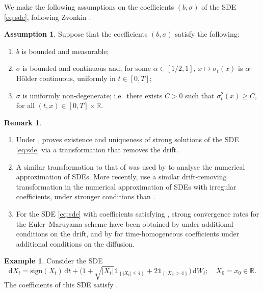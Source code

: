 \documentclass[onseside, final]{amsart}
\theoremstyle{definition}
\newtheorem{example}[theorem]{Example}
\newtheorem{remark}[theorem]{Remark}
\newtheorem{assumption}[theorem]{Assumption}
\newcommand{\R}{\mathbb R}
\newcommand{\sign}{\mathrm{sign}}
\newcommand{\D}{\,\mathrm{d}}
\newcommand{\ds}{\mathrm{d}}
\newcommand{\ind}[1]{\mathds{1}_{\!\left\{{#1}\right\}\!}}
\numberwithin{equation}{section}
\begin{document}
	We make the following assumptions on the coefficients $(b, \sigma)$ of the SDE \eqref{eq:sde}, following Zvonkin \citep{Zv74}.
	
	\begin{assumption}\label{ass:zvonkin}Suppose that the coefficients $(b, \sigma)$ satisfy the following:
		\begin{enumerate}[label = (\roman*)]
			\item $b$ is bounded and measurable;
			\item $\sigma$ is bounded and continuous and, for some $\alpha \in [1/2, 1]$, $x \mapsto \sigma_t(x)$ is $\alpha$-H\"older continuous, uniformly in $t \in [0, T]$;
			\item $\sigma$ is uniformly non-degenerate; i.e.\ there exists $C > 0$ such that $\sigma^2_t(x) \geq C$, for all $(t, x) \in [0, T] \times \R$.
		\end{enumerate}
	\end{assumption}
	
	\begin{remark}\label{rem:zvonkin}~
		\begin{enumerate}[label = (\roman*)]
			\item Under , \citet[Theorem 4]{Zv74} proves existence and uniqueness of strong solutions of the SDE \eqref{eq:sde} via a transformation that removes the drift.
			\item A similar transformation to that of \citep{Zv74} was used by \citet{Ta83} to analyse the numerical approximation of SDEs. More recently, \citet{NgTa17,NgTa17b,NgTa19,NeSz21,BaKaRo22,GeLaLi23} use a similar drift-removing transformation in the numerical approximation of SDEs with irregular coefficients, under stronger conditions than .
			\item For the SDE \eqref{eq:sde} with coefficients satisfying , strong convergence rates for the Euler--Maruyama scheme have been obtained by \citet{GyRa11} under additional conditions on the drift, and by \citet{DaGe20,DaGeLe23} for time-homogeneous coefficients under additional conditions on the diffusion.
		\end{enumerate}
		
	\end{remark}
	
	\begin{example}
		Consider the SDE
		\begin{equation}
			\ds X_t = \sign(X_t)\D t + \bigl(1 + \sqrt{|X_t|}\ind{|X_t| \leq 4} + 2\ind{|X_t|>4}\bigr) \D W_t; \quad X_0 = x_0 \in \R.
		\end{equation}
		The coefficients of this SDE satisfy .
	\end{example}
	
\end{document}
